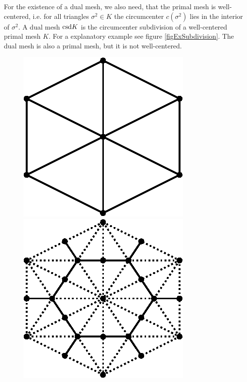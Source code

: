     For the existence of a dual mesh, we also need, that the primal mesh is well-centered, 
    i.e. for all triangles \( \sigma^{2}\in K \) the circumcenter \( c(\sigma^{2}) \) lies in the interior of \( \sigma^{2} \).
    A dual mesh \( \text{csd} K \) is the circumcenter subdivision of a well-centered primal mesh \( K \).
    For a explanatory example see figure \ref{figExSubdivision}.
    The dual mesh is also a primal mesh, but it is not well-centered.

    \begin{figure}
      \begin{minipage}[htp]{.24\textwidth}
        \centering
        \includegraphics[width=.9\textwidth]{bilder/tikz/K.eps}
      \end{minipage}\hfill
      \begin{minipage}[htp]{.24\textwidth}
        \centering
        \includegraphics[width=.9\textwidth]{bilder/tikz/CsdK.eps}

\end{minipage}
\end{figure}
